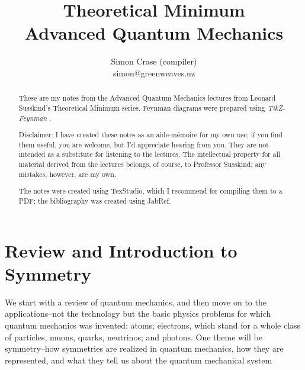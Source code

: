 \documentclass[]{article}
\title{Theoretical Minimum\\Advanced Quantum Mechanics}
\author{Simon Crase (compiler)\\simon@greenweaves.nz}
\begin{document}
\maketitle

\begin{abstract}
These are my notes from the Advanced Quantum Mechanics lectures\cite{susskind2013advanced}  from Leonard Susskind's Theoretical Minimum series\cite{susskind2007theoretical}. Feynman diagrams were prepared using \emph{TikZ-Feynman} \cite{ellis2016tikz}.

Disclaimer: I have created these notes as an aide-m\'emoire for my own use; if you find them useful, you are welcome, but I'd appreciate hearing from you. They are not intended 
as a substitute for listening to the lectures. The intellectual property for all material derived from the lectures belongs, of course, to Professor Susskind; any mistakes, however, are my own.

The notes were created using TexStudio\cite{TexStudio}, which I recommend for compiling them to a PDF; the bibliography was created using JabRef\cite{Jabref}.

\end{abstract}

\tableofcontents
\listoffigures
\listoftables
\listoftheorems


\section{Review and Introduction to Symmetry}

We start with a review of quantum mechanics, and then move on to the applications--not the technology but the basic physics problems for which quantum mechanics was invented: atoms; electrons, which stand for a whole class of particles, muons, quarks, neutrinos; and photons. One theme will be symmetry--how symmetries are realized in quantum mechanics, how they are represented, and what they tell us about the quantum mechanical system
\end{document}

